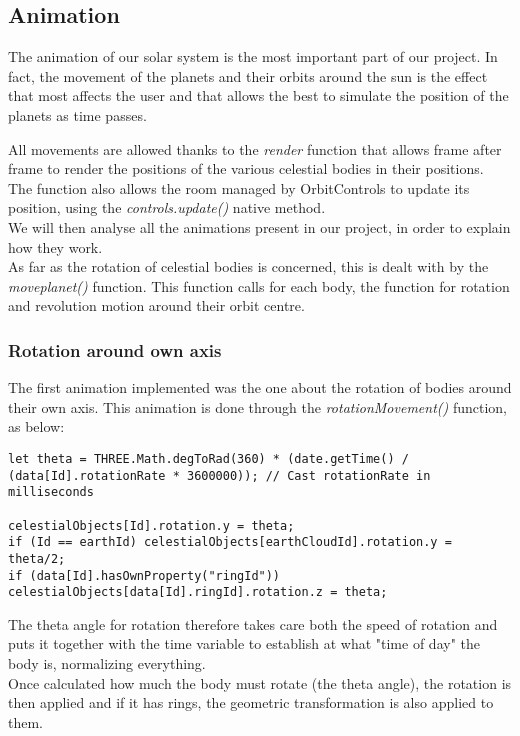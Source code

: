 \documentclass{article}
\begin{document}
\subsection{Animation}
The animation of our solar system is the most important part of our project. In fact, the movement of the planets and their orbits around the sun is the effect that most affects the user and that allows the best to simulate the position of the planets as time passes.
\par All movements are allowed thanks to the \textit{render} function that allows frame after frame to render the positions of the various celestial bodies in their positions.\\
The function also allows the room managed by OrbitControls to update its position, using the \textit{controls.update()} native method\cite{documentation:threejs}. \\
We will then analyse all the animations present in our project, in order to explain how they work.\\
As far as the rotation of celestial bodies is concerned, this is dealt with by the \textit{moveplanet()} function. This function calls for each body, the function for rotation and revolution motion around their orbit centre.

\subsubsection{Rotation around own axis}
The first animation implemented was the one about the rotation of bodies around their own axis. This animation is done through the \textit{rotationMovement()} function, as below:
\begin{lstlisting}
let theta = THREE.Math.degToRad(360) * (date.getTime() / (data[Id].rotationRate * 3600000)); // Cast rotationRate in milliseconds

celestialObjects[Id].rotation.y = theta;
if (Id == earthId) celestialObjects[earthCloudId].rotation.y = theta/2;
if (data[Id].hasOwnProperty("ringId")) celestialObjects[data[Id].ringId].rotation.z = theta;
\end{lstlisting}
The theta angle for rotation therefore takes care both the speed of rotation and puts it together with the time variable to establish at what "time of day" the body is, normalizing everything.\\
Once calculated how much the body must rotate (the theta angle), the rotation is then applied and if it has rings, the geometric transformation is also applied to them.
\end{document}
